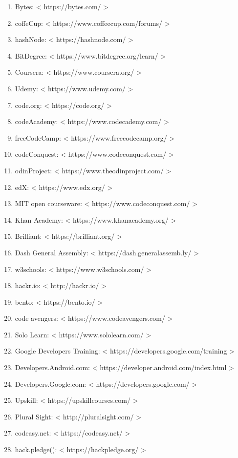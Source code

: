 \documentclass[12pt,a4paper]{article} %
\begin{document}
\begin{enumerate}
					\item Bytes: < https://bytes.com/ >
					\item coffeCup: < https://www.coffeecup.com/forums/ >
					\item hashNode: < https://hashnode.com/ >
					\item BitDegree: < https://www.bitdegree.org/learn/ >
					\item Coursera: < https://www.coursera.org/ >
					\item Udemy: < https://www.udemy.com/ >
					\item code.org: < https://code.org/ >
					\item codeAcademy: < https://www.codecademy.com/ >
					\item freeCodeCamp: < https://www.freecodecamp.org/ >
					\item codeConquest: < https://www.codeconquest.com/ >
					\item odinProject: < https://www.theodinproject.com/ >
					\item edX: < https://www.edx.org/ >
					\item MIT open courseware: < https://www.codeconquest.com/ >
					\item Khan Academy: < https://www.khanacademy.org/ >
					\item Brilliant: < https://brilliant.org/ >
					\item Dash General Assembly: < https://dash.generalassemb.ly/ >
					\item w3schools: < https://www.w3schools.com/ >
					\item hackr.io: < http://hackr.io/ >
					\item bento: < https://bento.io/ >
					\item code avengers: < https://www.codeavengers.com/ >
					\item Solo Learn: < https://www.sololearn.com/ >
					\item Google Developers Training: < https://developers.google.com/training >
					\item Developers.Android.com: < https://developer.android.com/index.html >
					\item Developers.Google.com: < https://developers.google.com/ >
					\item Upskill: < https://upskillcourses.com/ >
					\item Plural Sight: < http://pluralsight.com/ >
					\item codeasy.net: < https://codeasy.net/ >
					\item hack.pledge(): < https://hackpledge.org/ >

\end{enumerate}
\end{document}
